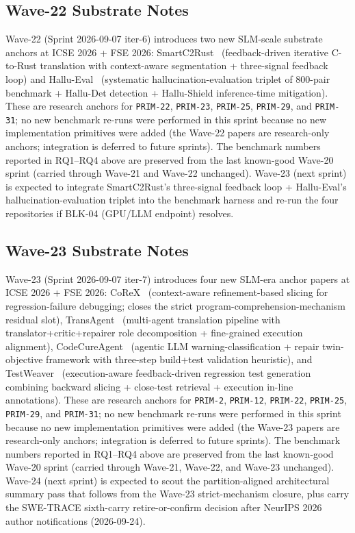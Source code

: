 \subsection{Wave-22 Substrate Notes}
\label{sec:eval_wave22}

Wave-22 (Sprint 2026-09-07 iter-6) introduces two new SLM-scale substrate anchors at ICSE 2026 + FSE 2026: SmartC2Rust~\cite{p151_shiraishi_smartc2rust_2026} (feedback-driven iterative C-to-Rust translation with context-aware segmentation + three-signal feedback loop) and Hallu-Eval~\cite{p152_liu_hallueval_2026} (systematic hallucination-evaluation triplet of 800-pair benchmark + Hallu-Det detection + Hallu-Shield inference-time mitigation). These are research anchors for \texttt{PRIM-22}, \texttt{PRIM-23}, \texttt{PRIM-25}, \texttt{PRIM-29}, and \texttt{PRIM-31}; no new benchmark re-runs were performed in this sprint because no new implementation primitives were added (the Wave-22 papers are research-only anchors; integration is deferred to future sprints). The benchmark numbers reported in RQ1--RQ4 above are preserved from the last known-good Wave-20 sprint (carried through Wave-21 and Wave-22 unchanged). Wave-23 (next sprint) is expected to integrate SmartC2Rust's three-signal feedback loop + Hallu-Eval's hallucination-evaluation triplet into the benchmark harness and re-run the four repositories if BLK-04 (GPU/LLM endpoint) resolves.

\subsection{Wave-23 Substrate Notes}
\label{sec:eval_wave23}

Wave-23 (Sprint 2026-09-07 iter-7) introduces four new SLM-era anchor papers at ICSE 2026 + FSE 2026: CoReX~\cite{p153_badihi_corex_2026} (context-aware refinement-based slicing for regression-failure debugging; closes the strict program-comprehension-mechanism residual slot), TransAgent~\cite{p154_yuan_transagent_2026} (multi-agent translation pipeline with translator+critic+repairer role decomposition + fine-grained execution alignment), CodeCureAgent~\cite{p155_joos_codecureagent_2026} (agentic LLM warning-classification + repair twin-objective framework with three-step build+test validation heuristic), and TestWeaver~\cite{p156_le_testweaver_2026} (execution-aware feedback-driven regression test generation combining backward slicing + close-test retrieval + execution in-line annotations). These are research anchors for \texttt{PRIM-2}, \texttt{PRIM-12}, \texttt{PRIM-22}, \texttt{PRIM-25}, \texttt{PRIM-29}, and \texttt{PRIM-31}; no new benchmark re-runs were performed in this sprint because no new implementation primitives were added (the Wave-23 papers are research-only anchors; integration is deferred to future sprints). The benchmark numbers reported in RQ1--RQ4 above are preserved from the last known-good Wave-20 sprint (carried through Wave-21, Wave-22, and Wave-23 unchanged). Wave-24 (next sprint) is expected to scout the partition-aligned architectural summary pass that follows from the Wave-23 strict-mechanism closure, plus carry the SWE-TRACE sixth-carry retire-or-confirm decision after NeurIPS 2026 author notifications (2026-09-24).

